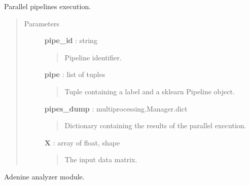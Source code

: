 \documentclass[letterpaper,10pt,english]{sphinxmanual}
\begin{document}
\begin{fulllineitems}
\label{index:adenine.core.pipelines.pipe_worker}
Parallel pipelines execution.
\begin{quote}\begin{description}
\item[{Parameters}] \leavevmode
\textbf{pipe\_id} : string
\begin{quote}

Pipeline identifier.
\end{quote}

\textbf{pipe} : list of tuples
\begin{quote}

Tuple containing a label and a sklearn Pipeline object.
\end{quote}

\textbf{pipes\_dump} : multiprocessing.Manager.dict
\begin{quote}

Dictionary containing the results of the parallel execution.
\end{quote}

\textbf{X} : array of float, shape
\begin{quote}

The input data matrix.
\end{quote}

\end{description}\end{quote}

\end{fulllineitems}

\label{index:module-adenine.core.analyze_results}
Adenine analyzer module.
\end{document}
